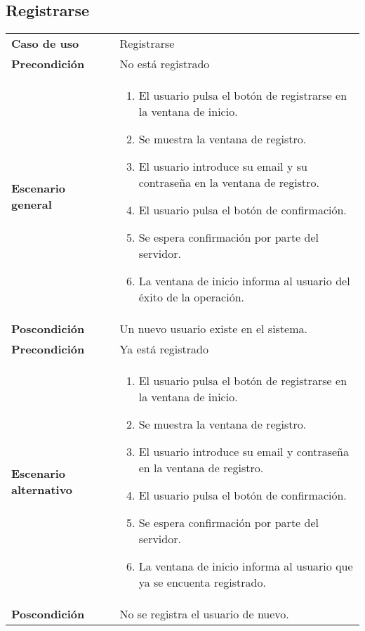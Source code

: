 

\subsection{Registrarse}

{\footnotesize
\begin{tabularx}{0.95\textwidth}{p{}|X}

\textbf{Caso de uso} & Registrarse \\

\textbf{Precondición} & No está registrado \\

\textbf{Escenario general} & \begin{enumerate}
\item El usuario pulsa el botón de registrarse en la ventana de inicio.
\item Se muestra la ventana de registro.
\item El usuario introduce su email y su contraseña en la ventana de registro.
\item El usuario pulsa el botón de confirmación.
\item Se espera confirmación por parte del servidor.
\item La ventana de inicio informa al usuario del éxito de la operación.
\end{enumerate} \\

\textbf{Poscondición} & Un nuevo usuario existe en el sistema.\\

\textbf{Precondición} & Ya está registrado\\
\textbf{Escenario alternativo} & \begin{enumerate}
 \item El usuario pulsa el botón de registrarse en la ventana de inicio.
\item Se muestra la ventana de registro.
\item El usuario introduce su email y contraseña en la ventana de registro.
\item El usuario pulsa el botón de confirmación.
\item Se espera confirmación por parte del servidor.
\item La ventana de inicio informa al usuario que ya se encuenta registrado.
\end{enumerate}\\
\textbf{Poscondición}& No se registra el usuario de nuevo.\\

\end{tabularx}
}

